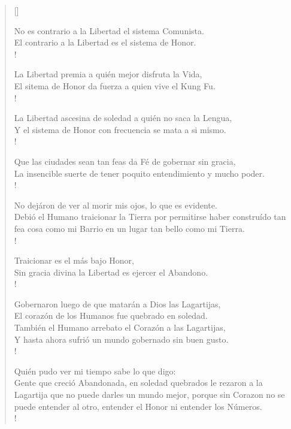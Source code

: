 \documentclass[11pt, a4paper]{article} %
\newcommand{\poemauthorright}[1]{\nopagebreak{\raggedleft\footnotesize\textsc{#1}\par}} %
\begin{document}

\settowidth{\versewidth}{Quiere mi tiempo libre la sutil, flexible dicha de buscarla, ------------------------------------------------------------------} %

\begin{verse}[\versewidth]
    {\scriptsize
    No es contrario a la Libertad el sistema Comunista. \\
    El contrario a la Libertad es el sistema de Honor. \\!

    La Libertad premia a quién mejor disfruta la Vida, \\
    El sitema de Honor da fuerza a quien vive el Kung Fu. \\!

    La Libertad ascesina de soledad a quién no saca la Lengua, \\
    Y el sistema de Honor con frecuencia se mata a si mismo. \\!

    Que las ciudades sean tan feas da Fé de gobernar sin gracia, \\
    La insencible suerte de tener poquito entendimiento y mucho poder. \\!

    No dejáron de ver al morir mis ojos, lo que es evidente. \\
    Debió el Humano traicionar la Tierra por permitirse haber construído 
    tan fea cosa como mi Barrio en un lugar tan bello como mi Tierra. \\!

    Traicionar es el más bajo Honor, \\
    Sin gracia divina la Libertad es ejercer el Abandono. \\!
    
    Gobernaron luego de que matarán a Dios las Lagartijas, \\
    El corazón de los Humanos fue quebrado en soledad. \\
    También el Humano arrebato el Corazón a las Lagartijas, \\
    Y hasta ahora sufrió un mundo gobernado sin buen gusto. \\!

    Quién pudo ver mi tiempo sabe lo que digo: \\
    Gente que creció Abandonada, en soledad quebrados le rezaron a la Lagartija 
    que no puede darles un mundo mejor, porque sin Corazon no se puede entender 
    al otro, entender el Honor ni entender los Números. \\!


}
\end{verse}


\poemauthorright{WAAJACU} %

\end{document}
